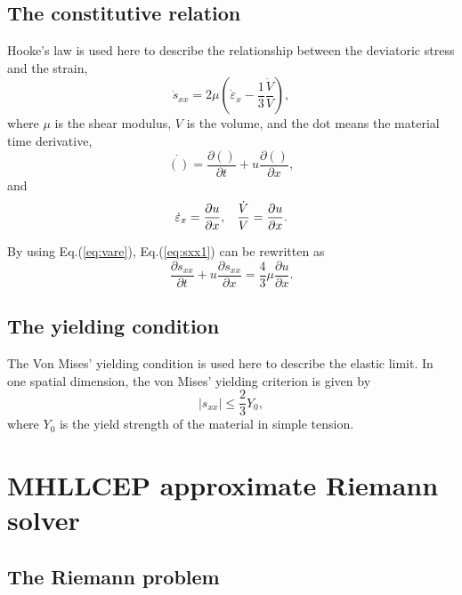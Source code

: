\documentclass[review]{elsarticle}
\begin{document}
\subsection{The constitutive relation}
Hooke's law is used here to describe the relationship between the deviatoric stress and the strain,
\begin{equation}\label{eq:sxx1}
\dot{s}_{xx} = 2\mu \left(\dot{\varepsilon}_x-\frac{1}{3}\frac{\dot{V}}{V}\right),
\end{equation}
where $\mu$ is the shear modulus, $V$ is the volume, and the dot means the material time derivative,
\begin{equation}\label{eq:mt}
  \dot{()} = \frac{\partial ()}{\partial t} + u \frac{\partial ()}{\partial x},
\end{equation}
and
\begin{equation}\label{eq:vare}
  \dot{\varepsilon}_x = \frac{\partial u}{\partial x}, \hspace{0.3cm} \frac{\dot{V}}{V} = \frac{\partial u}{\partial x}.
\end{equation}

By using Eq.(\ref{eq:vare}), Eq.(\ref{eq:sxx1}) can be rewritten as
\begin{equation}\label{eq:sxx}
  \frac{\partial s_{xx}}{\partial t} + u \frac{\partial s_{xx}}{\partial x} =\frac{4}{3}\mu \frac{\partial u}{\partial x}.
\end{equation}

\subsection{The yielding condition}
The Von Mises' yielding condition is used here to describe the elastic limit. In one spatial dimension, the von Mises' yielding criterion is given by
\begin{equation}
  |s_{xx}| \le \frac{2}{3}Y_0,
\end{equation}
where $Y_0$ is the yield strength of the material in simple tension.

  
\section{MHLLCEP approximate Riemann solver} \label{sec:HLLCEP}%
\subsection{The Riemann problem}
\end{document}
